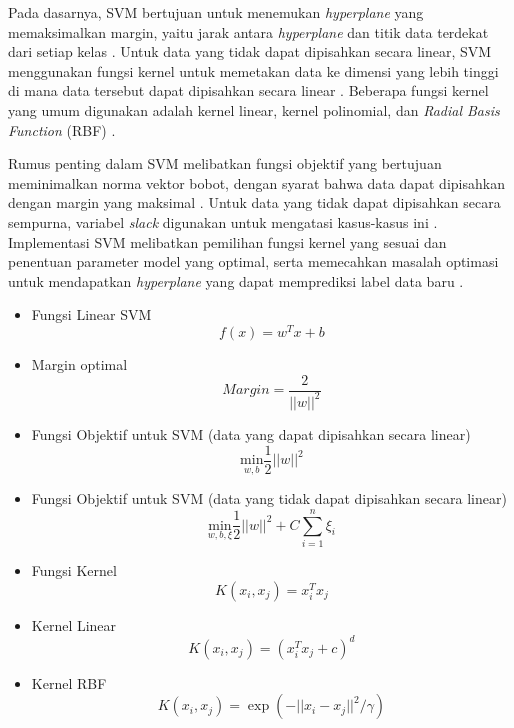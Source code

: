 \documentclass[conference]{IEEEtran}
\begin{document}
Pada dasarnya, SVM bertujuan untuk menemukan \textit{hyperplane} yang memaksimalkan margin, yaitu jarak antara \textit{hyperplane} dan titik data terdekat dari setiap kelas \cite{b21}. 
Untuk data yang tidak dapat dipisahkan secara linear, SVM menggunakan fungsi kernel untuk memetakan data ke dimensi yang lebih tinggi di mana data tersebut dapat dipisahkan secara linear \cite{b22}. 
Beberapa fungsi kernel yang umum digunakan adalah kernel linear, kernel polinomial, dan \textit{Radial Basis Function} (RBF) \cite{b20}.

Rumus penting dalam SVM melibatkan fungsi objektif yang bertujuan meminimalkan norma vektor bobot, dengan syarat bahwa data dapat dipisahkan dengan margin yang maksimal \cite{b21}. Untuk data yang tidak 
dapat dipisahkan secara sempurna, variabel \textit{slack} digunakan untuk mengatasi kasus-kasus ini \cite{b22}. Implementasi SVM melibatkan pemilihan fungsi kernel yang sesuai dan penentuan parameter 
model yang optimal, serta memecahkan masalah optimasi untuk mendapatkan \textit{hyperplane} yang dapat memprediksi label data baru \cite{b20}.

\begin{itemize}
    \item Fungsi Linear SVM
        \begin{equation}
            f(x) = w^T x + b
        \end{equation}
    \item Margin optimal
        \begin{equation}
            Margin = \frac{2}{||w||^2}
        \end{equation}
    \item Fungsi Objektif untuk SVM (data yang dapat dipisahkan secara linear)
        \begin{equation}
            \underset{w,b}{\text{min}} \frac{1}{2} ||w||^2
        \end{equation}
    \item Fungsi Objektif untuk SVM (data yang tidak dapat dipisahkan secara linear)
        \begin{equation}
            \underset{w,b,\xi}{\text{min}} \frac{1}{2} ||w||^2 + C \sum_{i=1}^n \xi_i
        \end{equation}
    \item Fungsi Kernel
        \begin{equation}
            K(x_i, x_j) = x_i^T x_j
        \end{equation}
    \item Kernel Linear
        \begin{equation}
            K(x_i, x_j) = (x_i^T x_j + c)^d
        \end{equation}
    \item Kernel RBF
        \begin{equation}
            K(x_i, x_j) = \exp(-||x_i - x_j||^2 / \gamma)
        \end{equation}
\end{itemize}
\end{document}
